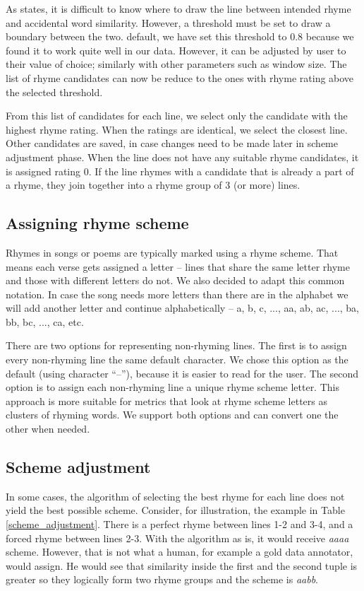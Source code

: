 As \cite{rhymes_overview} states, it is difficult to know where to draw the line between intended rhyme and accidental word similarity. However, a threshold must be set to draw a boundary between the two.  default, we have set this threshold to 0.8 because we found it to work quite well in our data. However, it can be adjusted by user to their value of choice; similarly with other parameters such as window size. The list of rhyme candidates can now be reduce to the ones with rhyme rating above the selected threshold.

From this list of candidates for each line, we select only the candidate with the highest rhyme rating. When the ratings are identical, we select the closest line. Other candidates are saved, in case changes need to be made later in scheme adjustment phase. When the line does not have any suitable rhyme candidates, it is assigned rating 0. If the line rhymes with a candidate that is already a part of a rhyme, they join together into a rhyme group of 3 (or more) lines.
 



\subsection{Assigning rhyme scheme}\label{sec:scheme}
 Rhymes in songs or poems are typically marked using a rhyme scheme. That means each verse gets assigned a letter -- lines that share the same letter rhyme and those with different letters do not. We also decided to adapt this common notation. In case the song needs more letters than there are in the alphabet\added{,} we will add another letter and continue alphabetically -- a, b, c, ..., aa, ab, ac, ..., ba, bb, bc, ..., ca, etc.
 
 There are two options for representing non-rhyming lines. The first is to assign every non-rhyming line the same default character. We chose this option as the default (using character ``--''), because it is easier to read for the user. The second option is to assign each non-rhyming line a unique rhyme scheme letter. This approach is more suitable for metrics that look at rhyme scheme letters as clusters of rhyming words. We support both options and can convert one  the other when needed.

\subsection{Scheme adjustment}\label{sec:scheme-adjustment}
In some cases, the algorithm of selecting the best rhyme for each line does not yield the best possible scheme. Consider, for illustration, the example in Table \ref{scheme_adjustment}. There is a perfect rhyme between lines 1-2 and 3-4, and a forced rhyme between lines 2-3. With the algorithm as is, it would receive \textit{aaaa} scheme. However, that is not what a human, for example a gold data annotator, would assign. He would see that similarity inside the first and the second tuple is greater so they logically form two rhyme groups and the scheme is \textit{aabb}. 

